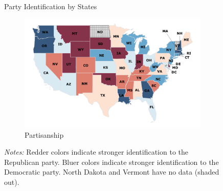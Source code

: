 \documentclass[12pt, letterpaper]{article}
\begin{document}
\begin{figure}
	\centering
	\caption{Party Identification by States}
	\begin{subfigure}[t]{0.7\textwidth}
		\centering
		\includegraphics[width=\textwidth]{../figs/map_pid7.pdf}
		\caption{Partisanship}
	\end{subfigure}
	\caption*{\footnotesize \emph{Notes:} 
		Redder colors indicate stronger identification to the Republican party.
		Bluer colors indicate stronger identification to the Democratic party.
		North Dakota and Vermont have no data (shaded out).
	}
	\label{fig:map_pid7}
\end{figure}
\end{document}
